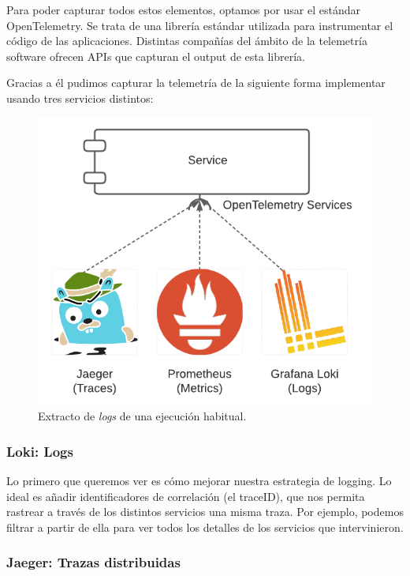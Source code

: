 Para poder capturar todos estos elementos, optamos por usar el estándar OpenTelemetry. Se trata de una librería estándar utilizada para instrumentar el código de las aplicaciones. Distintas compañías del ámbito de la telemetría software ofrecen APIs que capturan el output de esta librería.

Gracias a él pudimos capturar la telemetría de la siguiente forma implementar usando tres servicios distintos:

\begin{figure}[h]
  \centering
  \includegraphics[scale=0.75]{cap_despliegue/images/observability-telemetry-collection}
  \caption{Extracto de \emph{logs} de una ejecución habitual.}
  \label{fig:observability-telemetry-collection}
\end{figure}

\subsubsection{Loki: Logs}
Lo primero que queremos ver es cómo mejorar nuestra estrategia de logging. Lo ideal es añadir identificadores de correlación (el traceID), que nos permita rastrear a través de los distintos servicios una misma traza. Por ejemplo, podemos filtrar a partir de ella para ver todos los detalles de los servicios que intervinieron.

\subsubsection{Jaeger: Trazas distribuidas}

